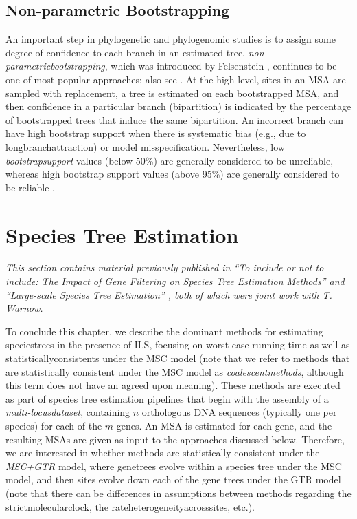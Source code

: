 \subsection{Non-parametric Bootstrapping} 
An important step in phylogenetic and \gls{phylogenomic} studies is to assign some degree of confidence to each branch in an estimated tree.
\textit{\Gls{non-parametricbootstrapping}}, which was introduced by Felsenstein \cite{felsenstein1985confidence}, continues to be one of most popular approaches; also see \cite{efron1996bootstrap, holmes2003bootstrapping}.
At the high level, \glspl{site} in an \gls{MSA} are sampled with replacement, a tree is estimated on each bootstrapped \gls{MSA}, and then confidence in a particular branch (\gls{bipartition}) is indicated by the percentage of bootstrapped trees that induce the same bipartition.
An incorrect branch can have high bootstrap support when there is systematic bias (e.g., due to \gls{longbranchattraction}) or model misspecification. 
Nevertheless, low \textit{\gls{bootstrapsupport}} values (below 50\%) are generally considered to be unreliable, whereas high bootstrap support values (above 95\%) are generally considered to be reliable \cite{swofford1996phylogenetic, warnow2017computational}.

\section{Species Tree Estimation}
\label{sec:background-smethods}
{\em This section contains material previously published in ``To include or not to include: The Impact of Gene Filtering on Species Tree Estimation Methods'' \cite{molloy2018include} and ``Large-scale Species Tree Estimation'' \cite{molloy2020large}, both of which were joint work with T. Warnow.}

\vspace{12pt}

To conclude this chapter, we describe the dominant methods for estimating \glspl{speciestree} in the presence of \gls{ILS}, focusing on worst-case running time as well as \glspl{statisticallyconsistent} under the \gls{MSC} model (note that we refer to methods that are statistically consistent under the MSC model as \textit{\glspl{coalescentmethod}}, although this term does not have an agreed upon meaning).
These methods are executed as part of species tree estimation pipelines that begin with the assembly of a \textit{\gls{multi-locusdataset}}, containing $n$ \gls{orthologous} DNA sequences (typically one per species) for each of the $m$ \glspl{gene}.
An \gls{MSA} is estimated for each gene, and the resulting MSAs are given as input to the approaches discussed below.
Therefore, we are interested in whether methods are statistically consistent under the \textit{\gls{MSC+GTR}} model, where \glspl{genetree} evolve within a species tree under the MSC model, and then sites evolve down each of the gene trees under the \gls{GTR} model (note that there can be differences in assumptions between methods regarding the \gls{strictmolecularclock}, the \gls{rateheterogeneityacrosssites}, etc.).

